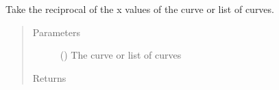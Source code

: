 \documentclass[letterpaper,10pt,english]{sphinxmanual}
\begin{document}
\begin{fulllineitems}
\label{\detokenize{pydv:pydvpy.recipx}}
Take the reciprocal of the x values of the curve or list of curves.

\begin{sphinxVerbatim}[commandchars=\\\{\}]
  
\end{sphinxVerbatim}

\begin{sphinxVerbatim}[commandchars=\\\{\}]
 
\end{sphinxVerbatim}

\begin{sphinxVerbatim}[commandchars=\\\{\}]
\end{sphinxVerbatim}

\begin{sphinxVerbatim}[commandchars=\\\{\}]
  
\end{sphinxVerbatim}
\begin{quote}\begin{description}
\item[{Parameters}] \leavevmode
{} ({\hyperref[\detokenize{pydv:curve.Curve}]{}}) \textendash{} The curve or list of curves

\item[{Returns}] \leavevmode


\end{description}\end{quote}

\end{fulllineitems}
\end{document}

